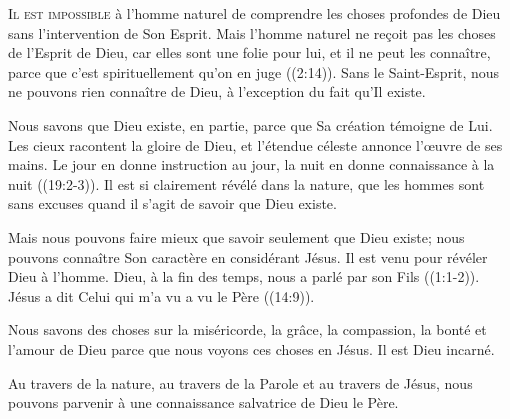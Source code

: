 \dvrule







\lettrine{I}{l est impossible} à l'homme naturel de comprendre
 les choses profondes de Dieu sans l'intervention de Son Esprit.
 \Og Mais l'homme naturel ne re\c{c}oit pas les choses de l'Esprit de Dieu,
 car elles sont une folie pour lui, et il ne peut les connaître,
 parce que c'est spirituellement qu'on en juge \Fg{}
 ((2:14)).
 Sans le Saint-Esprit, nous ne pouvons rien connaître de Dieu,
 à l'exception du fait qu'Il existe.

Nous savons que Dieu existe, en partie, parce que Sa création
 témoigne de Lui. \Og Les cieux racontent la gloire de Dieu,
 et l'étendue céleste annonce l'\oe{}uvre de ses mains.
 Le jour en donne instruction au jour, la nuit en donne connaissance
 à la nuit \Fg{} ((19:2-3)).
 Il est si clairement révélé dans la nature, que les hommes sont
 sans excuses quand il s'agit de savoir que Dieu existe.

Mais nous pouvons faire mieux que savoir seulement que Dieu existe;
 nous pouvons connaître Son caractère en considérant Jésus.
 Il est venu pour révéler Dieu à l'homme.
 \Og Dieu, à la fin des temps, nous a parlé par son Fils \Fg{}
 ((1:1-2)).
 Jésus a dit\frcolon{} 
 \Og Celui qui m'a vu a vu le Père \Fg{} ((14:9)).

Nous savons des choses sur la miséricorde, la grâce, la compassion,
 la bonté et l'amour de Dieu parce que nous voyons ces choses en Jésus.
 Il est Dieu incarné.

Au travers de la nature, au travers de la Parole et au travers de Jésus,
 nous pouvons parvenir à une connaissance salvatrice de Dieu le Père.


